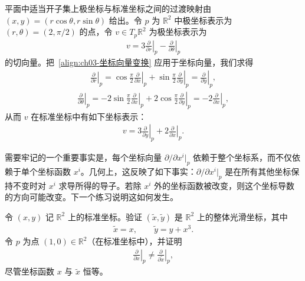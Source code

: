 \documentclass[../../main.tex]{subfiles}
\begin{document}
\begin{example}[极坐标]\label{example:ch03-极坐标}
平面中适当开子集上极坐标与标准坐标之间的过渡映射由 $(x,y)=(r\cos\theta,r\sin\theta)$ 给出。令 $p$ 为 $\mathbb{R}^{2}$ 中极坐标表示为 $(r,\theta)=(2,\pi/2)$ 的点，令 $v\in T_{p}\mathbb{R}^{2}$ 为极坐标表示为
\begin{align*}
v=3\left.\frac{\partial}{\partial r}\right|_{p}-\left.\frac{\partial}{\partial\theta}\right|_{p}
\end{align*}
的切向量。把~\eqref{align:ch03-坐标向量变换} 应用于坐标向量，我们求得
\begin{align*}
\left.\frac{\partial}{\partial r}\right|_{p}=\cos\frac{\pi}{2}\left.\frac{\partial}{\partial x}\right|_{p}+\sin\frac{\pi}{2}\left.\frac{\partial}{\partial y}\right|_{p}=\left.\frac{\partial}{\partial y}\right|_{p},
\end{align*}
\begin{align*}
\left.\frac{\partial}{\partial\theta}\right|_{p}=-2\sin\frac{\pi}{2}\left.\frac{\partial}{\partial x}\right|_{p}+2\cos\frac{\pi}{2}\left.\frac{\partial}{\partial y}\right|_{p}=-2\left.\frac{\partial}{\partial x}\right|_{p},
\end{align*}
从而 $v$ 在标准坐标中有如下坐标表示：
\begin{align*}
v=3\left.\frac{\partial}{\partial y}\right|_{p}+2\left.\frac{\partial}{\partial x}\right|_{p}.
\end{align*}
\end{example}

需要牢记的一个重要事实是，每个坐标向量 $\partial/\partial x^{i}|_{p}$ 依赖于整个坐标系，而不仅依赖于单个坐标函数 $x^{i}$。几何上，这反映了如下事实：$\partial/\partial x^{i}|_{p}$ 是在所有其他坐标保持不变时对 $x^{i}$ 求导所得的导子。若除 $x^{i}$ 外的坐标函数被改变，则这个坐标导数的方向可能改变。下一个练习说明这如何发生。

\begin{exercise}\label{exercise:ch03-3.17}
令 $(x,y)$ 记 $\mathbb{R}^{2}$ 上的标准坐标。验证 $(\widetilde{x},\widetilde{y})$ 是 $\mathbb{R}^{2}$ 上的整体光滑坐标，其中
\begin{align*}
\widetilde{x}=x,\qquad \widetilde{y}=y+x^{3}.
\end{align*}
令 $p$ 为点 $(1,0)\in\mathbb{R}^{2}$（在标准坐标中），并证明
\begin{align*}
\left.\frac{\partial}{\partial x}\right|_{p}\neq\left.\frac{\partial}{\partial\widetilde{x}}\right|_{p},
\end{align*}
尽管坐标函数 $x$ 与 $\widetilde{x}$ 恒等。
\end{exercise}
\end{document}
